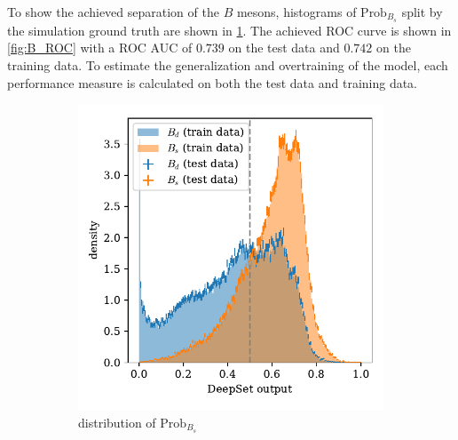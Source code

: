 To show the achieved separation of the $B$ mesons, histograms of $\text{Prob}_{B_s}$ split by the simulation ground truth are shown in \cref{fig:B_output}.
The achieved ROC curve is shown in \cref{fig:B_ROC} with a ROC AUC of $0.739$ on the test data and $0.742$ on the training data.
To estimate the generalization and overtraining of the model, each performance measure is calculated on both the test data and training data.

\begin{figure}
    \centering
    \begin{subfigure}{0.5\textwidth}
        \centering
        \includegraphics[width=\textwidth]{images/B_output.pdf}
        \caption{distribution of $\text{Prob}_{B_s}$}
        \label{fig:B_output}
    \end{subfigure}%
    \begin{subfigure}{0.5\textwidth}
        \centering

\end{subfigure}
\end{figure}
